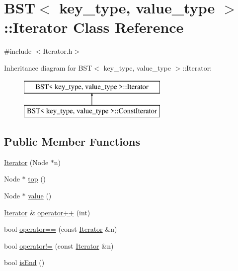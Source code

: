\hypertarget{class_b_s_t_1_1_iterator}{}\section{B\+ST$<$ key\+\_\+type, value\+\_\+type $>$\+::Iterator Class Reference}
\label{class_b_s_t_1_1_iterator}


{\ttfamily \#include $<$Iterator.\+h$>$}

Inheritance diagram for B\+ST$<$ key\+\_\+type, value\+\_\+type $>$\+::Iterator\+:\begin{figure}[H]
\begin{center}
\leavevmode
\includegraphics[height=2.000000cm]{class_b_s_t_1_1_iterator}
\end{center}
\end{figure}
\subsection*{Public Member Functions}
\begin{DoxyCompactItemize}
\item 
\mbox{\hyperlink{class_b_s_t_1_1_iterator_af7bc2cb09f5e0e7c94ec2074c1ac1982}{Iterator}} (Node $\ast$n)
\item 
Node $\ast$ \mbox{\hyperlink{class_b_s_t_1_1_iterator_abcfd0f8dcfb0a3c7d2462208e682c7c1}{top}} ()
\item 
Node $\ast$ \mbox{\hyperlink{class_b_s_t_1_1_iterator_a51c31d4c55b51c61743eba6010df6209}{value}} ()
\item 
\mbox{\hyperlink{class_b_s_t_1_1_iterator}{Iterator}} \& \mbox{\hyperlink{class_b_s_t_1_1_iterator_a9c8bece64bfbb3f4539cb59a2bc94550}{operator++}} (int)
\item 
bool \mbox{\hyperlink{class_b_s_t_1_1_iterator_ae77a4cfb591f0fcce064dc48efe55c31}{operator==}} (const \mbox{\hyperlink{class_b_s_t_1_1_iterator}{Iterator}} \&n)
\item 
bool \mbox{\hyperlink{class_b_s_t_1_1_iterator_a49160c9e2cfa6251c2b4def2787c97f6}{operator!=}} (const \mbox{\hyperlink{class_b_s_t_1_1_iterator}{Iterator}} \&n)
\item 
bool \mbox{\hyperlink{class_b_s_t_1_1_iterator_ad3fd40a6dd0db04db41c372d4ea2856a}{is\+End}} ()
\end{DoxyCompactItemize}


